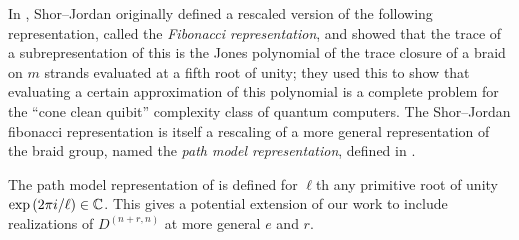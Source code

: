 \documentclass{amsart}
\begin{document}
  In \cite{Shor}, Shor--Jordan originally defined a rescaled version of the following representation, called the \emph{Fibonacci representation}, and showed that the trace of a subrepresentation of this is the Jones polynomial of the trace closure of a braid on $m$ strands evaluated at a fifth root of unity;
  they used this to show that evaluating a certain approximation of this polynomial is a complete problem for the ``cone clean quibit'' complexity class of quantum computers.
  The Shor--Jordan fibonacci representation is itself a rescaling of a more general representation of the braid group, named the \emph{path model representation}, defined in \cite{Aharonov}.
  
  \begin{remark}
    The path model representation of \cite{Aharonov} is defined for $\ell$th any primitive root of unity $\text{exp}\left( 2 \pi i/\ell \right) \in \mathbb{C}$.
    This gives a potential extension of our work to include realizations of $D^{(n+r,n)}$ at more general $e$ and $r$.
  \end{remark}
\end{document}
